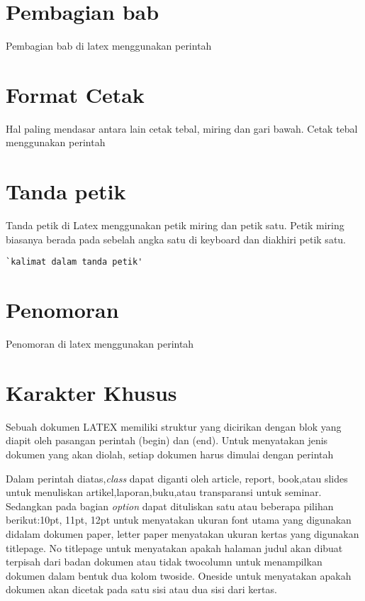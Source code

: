 \section{Pembagian bab}
Pembagian bab di latex menggunakan perintah 


\section{Format Cetak}
Hal paling mendasar antara lain cetak tebal, miring dan gari bawah. Cetak tebal menggunakan perintah 

\section{Tanda petik}
Tanda petik di Latex menggunakan petik miring dan petik satu. Petik miring biasanya berada pada sebelah angka satu di keyboard dan diakhiri petik satu.

\begin{lstlisting}[caption=Contoh kalimat dalam tanda petik di Latex,label={lst:tandapetik}]
`kalimat dalam tanda petik'
\end{lstlisting}

\section{Penomoran}
Penomoran di latex menggunakan perintah 

\section{Karakter Khusus}

Sebuah dokumen LATEX memiliki struktur yang dicirikan dengan blok yang diapit oleh pasangan perintah (begin) dan (end). Untuk menyatakan jenis dokumen yang akan diolah, setiap dokumen harus dimulai dengan perintah


Dalam perintah diatas,\textit{class} dapat diganti oleh article, report, book,atau slides untuk menuliskan artikel,laporan,buku,atau transparansi untuk seminar. Sedangkan pada bagian \textit{option} dapat dituliskan satu atau beberapa pilihan berikut:10pt, 11pt, 12pt untuk menyatakan ukuran font utama yang digunakan didalam dokumen paper, letter paper menyatakan ukuran kertas yang digunakan titlepage. No titlepage untuk menyatakan apakah halaman judul akan dibuat terpisah dari badan dokumen atau tidak twocolumn untuk menampilkan dokumen dalam bentuk dua kolom twoside. Oneside untuk menyatakan apakah dokumen akan dicetak pada satu sisi atau dua sisi dari kertas.


